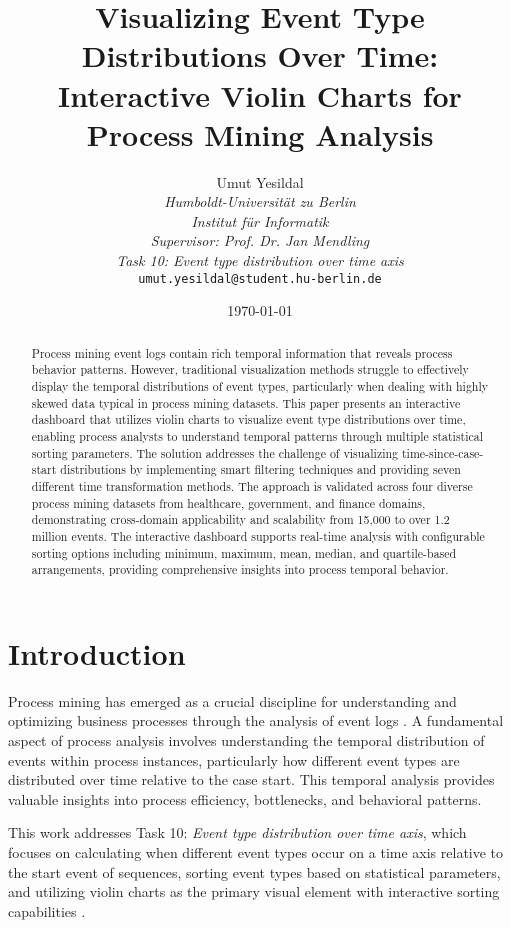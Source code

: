 \documentclass[11pt,a4paper]{article}
\title{Visualizing Event Type Distributions Over Time: Interactive Violin Charts for Process Mining Analysis}
\author{
    Umut Yesildal \\
    \textit{Humboldt-Universität zu Berlin} \\
    \textit{Institut für Informatik} \\
    \textit{Supervisor: Prof. Dr. Jan Mendling} \\
    \textit{Task 10: Event type distribution over time axis} \\
    \texttt{umut.yesildal@student.hu-berlin.de}
}
\date{\today}
\begin{document}
\maketitle

\begin{abstract}
Process mining event logs contain rich temporal information that reveals process behavior patterns. However, traditional visualization methods struggle to effectively display the temporal distributions of event types, particularly when dealing with highly skewed data typical in process mining datasets. This paper presents an interactive dashboard that utilizes violin charts to visualize event type distributions over time, enabling process analysts to understand temporal patterns through multiple statistical sorting parameters. The solution addresses the challenge of visualizing time-since-case-start distributions by implementing smart filtering techniques and providing seven different time transformation methods. The approach is validated across four diverse process mining datasets from healthcare, government, and finance domains, demonstrating cross-domain applicability and scalability from 15,000 to over 1.2 million events. The interactive dashboard supports real-time analysis with configurable sorting options including minimum, maximum, mean, median, and quartile-based arrangements, providing comprehensive insights into process temporal behavior.
\end{abstract}

\section{Introduction}
\label{sec:introduction}

Process mining has emerged as a crucial discipline for understanding and optimizing business processes through the analysis of event logs \cite{aalst2016process}. A fundamental aspect of process analysis involves understanding the temporal distribution of events within process instances, particularly how different event types are distributed over time relative to the case start. This temporal analysis provides valuable insights into process efficiency, bottlenecks, and behavioral patterns.

This work addresses Task 10: \textit{Event type distribution over time axis}, which focuses on calculating when different event types occur on a time axis relative to the start event of sequences, sorting event types based on statistical parameters, and utilizing violin charts as the primary visual element with interactive sorting capabilities \cite{chen2015survey}.
\end{document}

